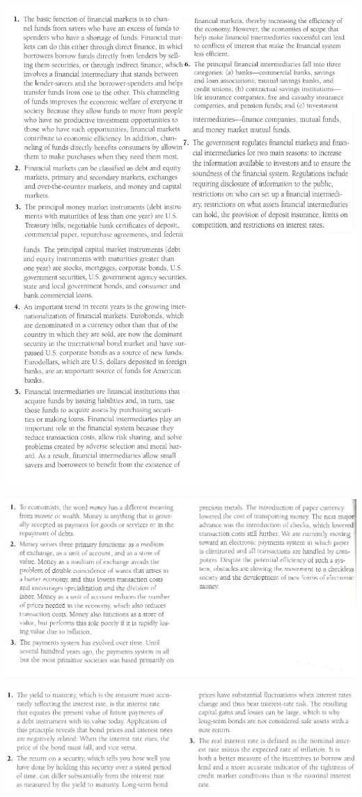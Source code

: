\documentclass[12pt]{examnotes}
\begin{document}
\obeylines  
\setlength\baselineskip{15pt}

\includegraphics[scale=0.3]{./imgs/2sum.jpg}

\includegraphics[scale=0.5]{./imgs/3sum.jpg}

\includegraphics[scale=0.5]{./imgs/4sum.jpg}
\end{document}

